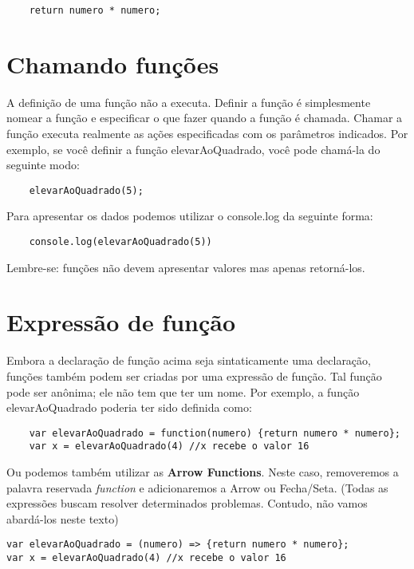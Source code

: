 \begin{lstlisting}
	return numero * numero;
\end{lstlisting}

\section{Chamando funções}

A definição de uma função não a executa. Definir a função é simplesmente nomear a função e especificar o que fazer quando a função é chamada. Chamar a função executa realmente as ações especificadas com os parâmetros indicados. Por exemplo, se você definir a função elevarAoQuadrado, você pode chamá-la do seguinte modo: 

\begin{lstlisting}
	elevarAoQuadrado(5);
\end{lstlisting}

Para apresentar os dados podemos utilizar o console.log da seguinte forma:

\begin{lstlisting}
	console.log(elevarAoQuadrado(5))
\end{lstlisting}

Lembre-se: funções não devem apresentar valores mas apenas retorná-los. 

\section{Expressão de função}

Embora a declaração de função acima seja sintaticamente uma declaração, funções também podem ser criadas por uma expressão de função. Tal função pode ser anônima; ele não tem que ter um nome. Por exemplo, a função elevarAoQuadrado poderia ter sido definida como:

\begin{lstlisting}
	var elevarAoQuadrado = function(numero) {return numero * numero}; 
	var x = elevarAoQuadrado(4) //x recebe o valor 16
\end{lstlisting}

Ou podemos também utilizar as \textbf{Arrow Functions}. Neste caso, removeremos a palavra reservada \textit{function} e adicionaremos a Arrow ou Fecha/Seta. (Todas as expressões buscam resolver determinados problemas. Contudo, não vamos abardá-los neste texto)

\begin{lstlisting}
var elevarAoQuadrado = (numero) => {return numero * numero}; 
var x = elevarAoQuadrado(4) //x recebe o valor 16
\end{lstlisting}

